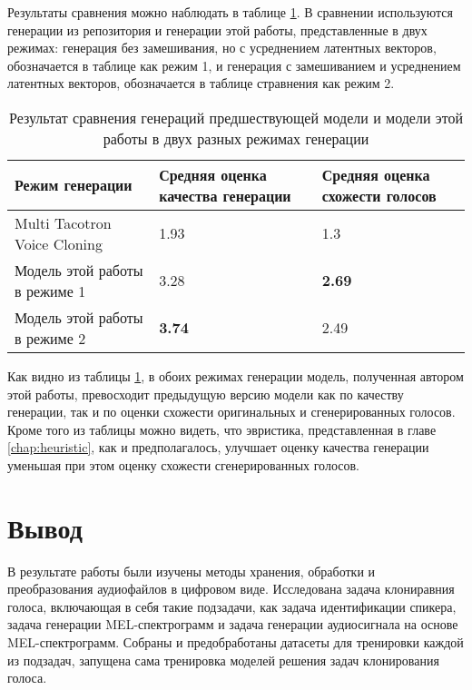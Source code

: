 \documentclass[oneside,final,14pt]{extreport}
\begin{document}
Результаты сравнения можно наблюдать в таблице \ref{table:evaluation}. В сравнении используются генерации из репозитория \cite{bib:russian_voice_cloning}и генерации этой работы, представленные в двух режимах: генерация без замешивания, но с усреднением латентных векторов, обозначается в таблице как режим 1,  и генерация с замешиванием и усреднением латентных векторов, обозначается в таблице стравнения как режим 2. 

\begin{table}[H] 
\begin{tabularx}{\textwidth}{|X|X|X|}
\hline
Режим генерации
&
Средняя оценка качества генерации
&
Средняя оценка схожести голосов
\\
\hline
Multi Tacotron Voice Cloning \cite{bib:russian_voice_cloning}
&
1.93
 &
 1.3
\\
\hline
Модель этой работы в режиме 1
&
3.28
&
{\bf 2.69}
\\
\hline
Модель этой работы в режиме 2
&
{\bf 3.74}
 &
2.49
\\
\hline
\end{tabularx}
\caption{Результат сравнения генераций предшествующей  модели и модели этой работы в двух разных режимах генерации}
\label{table:evaluation}
\end{table}

Как видно из таблицы \ref{table:evaluation}, в обоих режимах генерации модель, полученная автором этой работы, превосходит предыдущую версию модели как по качеству генерации, так и по оценки схожести оригинальных и сгенерированных голосов.  Кроме того из таблицы можно видеть, что эвристика, представленная в главе \ref{chap:heuristic}, как и предполагалось, улучшает оценку качества генерации уменьшая при этом оценку схожести сгенерированных голосов. 

\chapter{Вывод}
В результате работы были изучены методы хранения, обработки и преобразования аудиофайлов в цифровом виде. Исследована задача клониравния голоса, включающая в себя такие подзадачи, как задача идентификации спикера, задача генерации MEL-спектрограмм и задача генерации аудиосигнала на основе MEL-спектрограмм. Собраны и предобработаны датасеты для тренировки каждой из подзадач, запущена сама тренировка моделей решения задач клонирования голоса.
\end{document}
